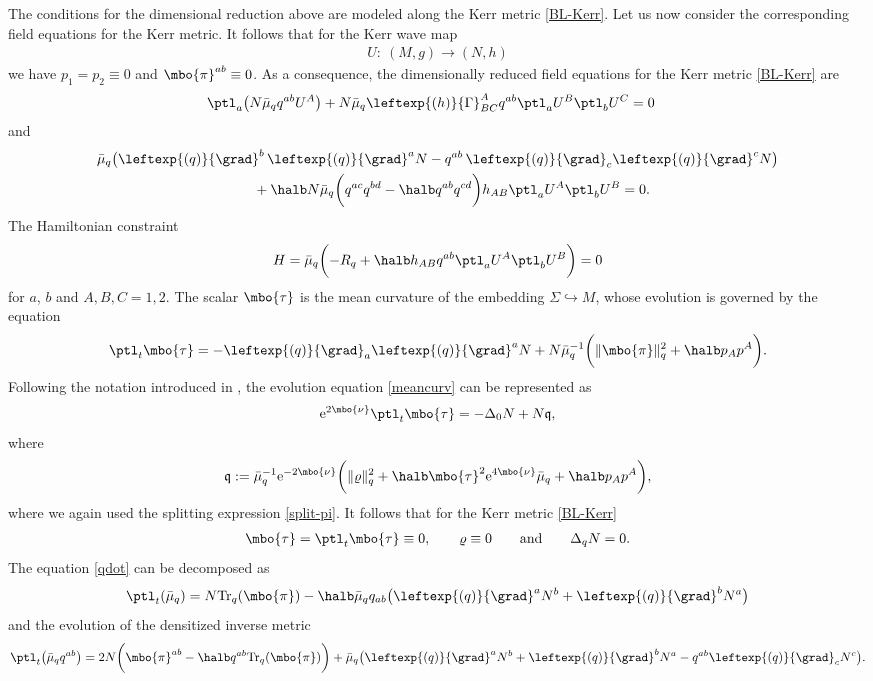 The conditions for the dimensional reduction above are modeled along the Kerr metric \eqref{BL-Kerr}.
Let us now consider the corresponding field equations for the Kerr metric. It follows that for the Kerr wave map
\begin{align*}
 U \colon\ (M, g) \to (N, h)
 \end{align*}
 we have $p_1= p_2 \equiv 0$
 and $ \mbo{\pi}^{ab} \equiv 0$. As a consequence, the dimensionally reduced field equations for the Kerr metric \eqref{BL-Kerr} are
 \begin{align}
 \ptl_a \bigl(N \bar{\mu}_q q^{ab} U^A\bigr) + N \bar{\mu}_q \leftexp{(h)}{\Gamma}^{A}_{BC} q^{ab} \ptl_a U^B \ptl_b U^C&{}=0 \label{Kerr-p-dot}
 \end{align}
and
\begin{gather*}
 \bar{\mu}_q \bigl(\leftexp{(q)}{\grad}^b \, \leftexp{(q)}{\grad}^a N - q^{ab} \, \leftexp{(q)}{\grad}_c \leftexp{(q)}{\grad}^c N \bigr) \notag\\
\qquad{} + \halb N \bar{\mu}_q \biggl(q^{ac} q^{bd} - \halb q^{ab} q^{cd}\biggr) h_{AB} \ptl_a U^A \ptl_b U^B=0.
\end{gather*}
The Hamiltonian constraint
\begin{align*}
H = \bar{\mu}_q \biggl(-R_q + \halb h_{AB} q^{ab} \ptl_a U^A \ptl_b U^B\biggr) =0
\end{align*}
for $a$, $b$ and $A, B, C = 1, 2$.
The scalar $\mbo{\tau}$ is the mean curvature of the embedding $\Sigma \hookrightarrow M$, whose evolution is governed by the equation
\begin{align}\label{meancurv}
\ptl_t \mbo{\tau} = - \leftexp{(q)}{\grad}_a \leftexp{(q)}{\grad}^a N + N \bar{\mu}^{-1}_q \biggl(\Vert \mbo{\pi} \Vert_q^2 + \halb p_A p^A\biggr).
\end{align}
Following the notation introduced in \cite{kaluz1}, the evolution equation \eqref{meancurv} can be represented as
\begin{align*}
{\rm e}^{2\mbo{\nu}} \ptl_t \mbo{\tau} = - \Delta_0 N + N \mathfrak{q},
\end{align*}
where
\begin{align*}
\mathfrak{q} := \bar{\mu}^{-1}_q {\rm e}^{-2\mbo{\nu}}\biggl(\Vert \varrho \Vert^2_q + \halb \mbo{\tau}^2 {\rm e}^{4\mbo{\nu}} \bar{\mu}_q + \halb p_A p^A \biggr),
\end{align*}
where we again used the splitting expression \eqref{split-pi}. It follows that for the Kerr metric \eqref{BL-Kerr}
\begin{align}
\mbo{\tau} = \ptl_t \mbo{\tau} \equiv 0, \qquad \varrho \equiv 0 \qquad \text{and} \qquad \Delta_q N =0. \label{kerr-maximal}
\end{align}
The equation \eqref{qdot} can be decomposed as
\[
\ptl_t (\bar{\mu}_q) = N {\rm Tr}_q (\mbo{\pi}) - \halb \bar{\mu}_q q_{ab}\bigl(\leftexp{(q)}{\grad}^a N^b + \leftexp{(q)}{\grad}^b N^a \bigr)
\]
and the evolution of the densitized inverse metric
\[
\ptl_t \bigl(\bar{\mu}_q q^{ab}\bigr) = 2 N \biggl(\mbo{\pi}^{ab} - \halb q^{ab} {\rm Tr}_q(\mbo{\pi})\biggr) + \bar{\mu}_q \bigl(\leftexp{(q)}{\grad}^a N^b + \leftexp{(q)}{\grad}^b N^a - q^{ab} \leftexp{(q)}{\grad}_c N^c \bigr).
\]

